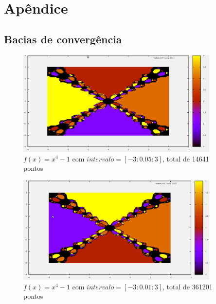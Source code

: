
\chapter{Apêndice}\label{chap:appendix}
\section{Bacias de convergência}\label{section:convBasins}
  \begin{figure}[htp]
    \centering
    \includegraphics[width=0.9\textwidth]{imgs/img1.png}
    \caption{$f(x) = x^4 -1$ com $intervalo = [-3: 0.05: 3]$, total de 14641 pontos}
  \end{figure}

  \begin{figure}[htp]
    \centering
    \includegraphics[width=0.9\textwidth]{imgs/img2.png}
    \caption{$f(x) = x^4 -1$ com $intervalo = [-3: 0.01: 3]$, total de 361201 pontos}
  \end{figure}

